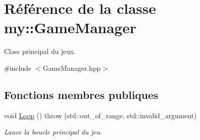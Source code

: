 \hypertarget{classmy_1_1GameManager}{}\section{Référence de la classe my\+:\+:Game\+Manager}
\label{classmy_1_1GameManager}


Class principal du jeux.  




{\ttfamily \#include $<$Game\+Manager.\+hpp$>$}

\subsection*{Fonctions membres publiques}
\begin{DoxyCompactItemize}
\item 
void \hyperlink{classmy_1_1GameManager_ae4f3327cd31637d91c8089a4b7457739}{Loop} ()  throw (std\+::out\+\_\+of\+\_\+range, std\+::invalid\+\_\+argument)
\begin{DoxyCompactList}\small\item\em Lance la boucle principal du jeu. \end{DoxyCompactList}\end{DoxyCompactItemize}
